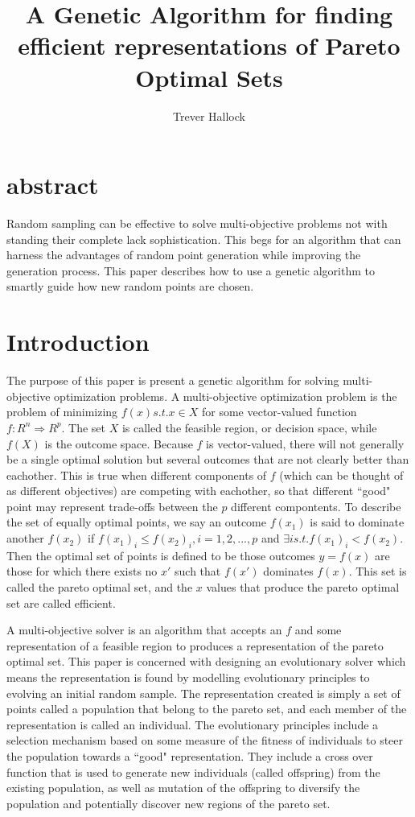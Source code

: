 \documentclass{article}
\author{Trever Hallock}
\title{A Genetic Algorithm for finding efficient representations of Pareto Optimal Sets}
\begin{document}
\section{abstract}
Random sampling can be effective to solve multi-objective problems not with standing their complete lack sophistication.
This begs for an algorithm that can harness the advantages of random point generation while improving the generation process.
This paper describes how to use a genetic algorithm to smartly guide how new random points are chosen.


\section{Introduction}

The purpose of this paper is present a genetic algorithm for solving multi-objective optimization problems.
A multi-objective optimization problem is the problem of minimizing $f(x) s.t. x \in X$ for some vector-valued function $f:R^n \Rightarrow R^p$.
The set $X$ is called the feasible region, or decision space, while $f(X)$ is the outcome space.
Because $f$ is vector-valued, there will not generally be a single optimal solution but several outcomes that are not clearly better than eachother.
This is true when different components of $f$ (which can be thought of as different objectives) are competing with eachother, so that different ``good" point may represent trade-offs between the $p$ 
different compontents.
To describe the set of equally optimal points, we say an outcome $f(x_1)$ is said to dominate another $f(x_2)$ if $f(x_1)_i \le f(x_2)_i, i=1,2, ..., p$ and $\exists i s.t. f(x_1)_i < f(x_2)$.
Then the optimal set of points is defined to be those outcomes $y = f(x)$ are those for which there exists no $x'$ such that $f(x')$ dominates $f(x)$.
This set is called the pareto optimal set, and the $x$ values that produce the pareto optimal set are called efficient.

A multi-objective solver is an algorithm that accepts an $f$ and some representation of a feasible region to produces a representation of the pareto optimal set.
This paper is concerned with designing an evolutionary solver which means the representation is found by modelling evolutionary principles to evolving an initial random sample.
The representation created is simply a set of points called a population that belong to the pareto set, and each member of the representation is called an individual.
The evolutionary principles include a selection mechanism based on some measure of the fitness of individuals to steer the population towards a ``good" representation.
They include a cross over function that is used to generate new individuals (called offspring) from the existing population, as well as mutation of the offspring
to diversify the population and potentially discover new regions of the pareto set.
\end{document}

